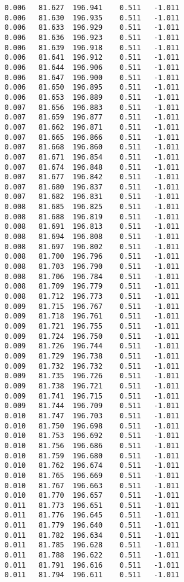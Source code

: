 \begin{verbatim}
   0.006   81.627  196.941    0.511   -1.011
   0.006   81.630  196.935    0.511   -1.011
   0.006   81.633  196.929    0.511   -1.011
   0.006   81.636  196.923    0.511   -1.011
   0.006   81.639  196.918    0.511   -1.011
   0.006   81.641  196.912    0.511   -1.011
   0.006   81.644  196.906    0.511   -1.011
   0.006   81.647  196.900    0.511   -1.011
   0.006   81.650  196.895    0.511   -1.011
   0.006   81.653  196.889    0.511   -1.011
   0.007   81.656  196.883    0.511   -1.011
   0.007   81.659  196.877    0.511   -1.011
   0.007   81.662  196.871    0.511   -1.011
   0.007   81.665  196.866    0.511   -1.011
   0.007   81.668  196.860    0.511   -1.011
   0.007   81.671  196.854    0.511   -1.011
   0.007   81.674  196.848    0.511   -1.011
   0.007   81.677  196.842    0.511   -1.011
   0.007   81.680  196.837    0.511   -1.011
   0.007   81.682  196.831    0.511   -1.011
   0.008   81.685  196.825    0.511   -1.011
   0.008   81.688  196.819    0.511   -1.011
   0.008   81.691  196.813    0.511   -1.011
   0.008   81.694  196.808    0.511   -1.011
   0.008   81.697  196.802    0.511   -1.011
   0.008   81.700  196.796    0.511   -1.011
   0.008   81.703  196.790    0.511   -1.011
   0.008   81.706  196.784    0.511   -1.011
   0.008   81.709  196.779    0.511   -1.011
   0.008   81.712  196.773    0.511   -1.011
   0.009   81.715  196.767    0.511   -1.011
   0.009   81.718  196.761    0.511   -1.011
   0.009   81.721  196.755    0.511   -1.011
   0.009   81.724  196.750    0.511   -1.011
   0.009   81.726  196.744    0.511   -1.011
   0.009   81.729  196.738    0.511   -1.011
   0.009   81.732  196.732    0.511   -1.011
   0.009   81.735  196.726    0.511   -1.011
   0.009   81.738  196.721    0.511   -1.011
   0.009   81.741  196.715    0.511   -1.011
   0.009   81.744  196.709    0.511   -1.011
   0.010   81.747  196.703    0.511   -1.011
   0.010   81.750  196.698    0.511   -1.011
   0.010   81.753  196.692    0.511   -1.011
   0.010   81.756  196.686    0.511   -1.011
   0.010   81.759  196.680    0.511   -1.011
   0.010   81.762  196.674    0.511   -1.011
   0.010   81.765  196.669    0.511   -1.011
   0.010   81.767  196.663    0.511   -1.011
   0.010   81.770  196.657    0.511   -1.011
   0.011   81.773  196.651    0.511   -1.011
   0.011   81.776  196.645    0.511   -1.011
   0.011   81.779  196.640    0.511   -1.011
   0.011   81.782  196.634    0.511   -1.011
   0.011   81.785  196.628    0.511   -1.011
   0.011   81.788  196.622    0.511   -1.011
   0.011   81.791  196.616    0.511   -1.011
   0.011   81.794  196.611    0.511   -1.011

\end{verbatim}
